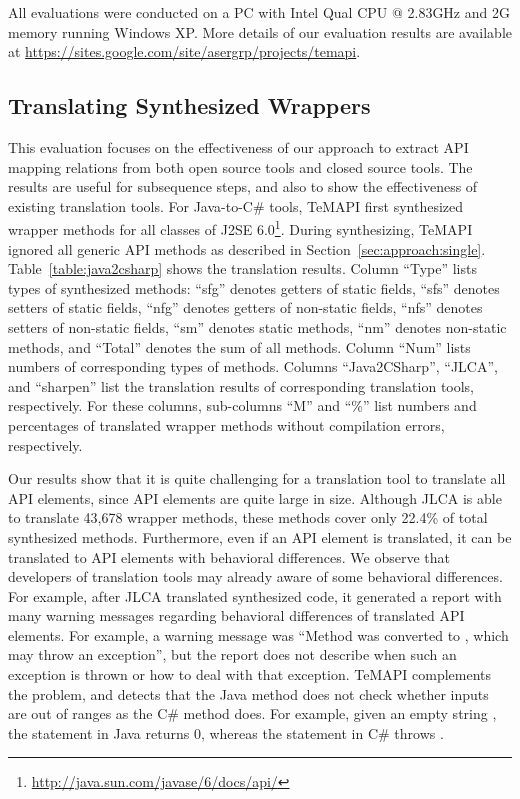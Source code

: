 All evaluations were conducted on a PC with Intel Qual CPU @ 2.83GHz and 2G memory running Windows XP. More details
of our evaluation results are available at \url{https://sites.google.com/site/asergrp/projects/temapi}.

\subsection{Translating Synthesized Wrappers}
\label{sec:evaluation:element}
This evaluation focuses on the effectiveness of our approach to extract API mapping relations from both open source tools and closed source tools. The results are useful for subsequence steps, and also to show the effectiveness of existing translation tools. For Java-to-C\# tools, TeMAPI first synthesized wrapper methods for all classes of J2SE 6.0\footnote{\url{http://java.sun.com/javase/6/docs/api/}}. During synthesizing,  TeMAPI ignored all generic API methods as described in Section~\ref{sec:approach:single}. Table~\ref{table:java2csharp} shows the translation results. Column ``Type'' lists types of synthesized methods: ``sfg'' denotes getters of static fields, ``sfs'' denotes setters of static fields, ``nfg'' denotes getters of non-static fields, ``nfs'' denotes setters of non-static fields, ``sm'' denotes static methods, ``nm'' denotes non-static methods, and ``Total'' denotes the sum of all methods. Column ``Num'' lists numbers of corresponding types of methods. Columns ``Java2CSharp'', ``JLCA'', and ``sharpen'' list the translation results of corresponding translation tools, respectively. For these columns, sub-columns ``M'' and ``\%'' list numbers and percentages of translated wrapper methods without compilation errors, respectively.

Our results show that it is quite challenging for a translation tool to translate all API elements, since API elements are quite large in size. Although JLCA is able to translate 43,678 wrapper methods, these methods cover only 22.4\% of total synthesized methods. Furthermore, even if an API element is translated, it can be translated to API elements with behavioral differences. We observe that developers of translation tools may already aware of some behavioral differences. For example, after JLCA translated synthesized code, it generated a report with many warning messages regarding behavioral differences of translated API elements. For example, a warning message was ``Method  was converted to , which may throw an exception'', but the report does not describe when such an exception is thrown or how to deal with that exception. TeMAPI complements the problem, and detects that the Java method does not check whether inputs are out of ranges as the C\# method does. For example, given an empty string , the  statement in Java returns 0, whereas the  statement in C\# throws .

